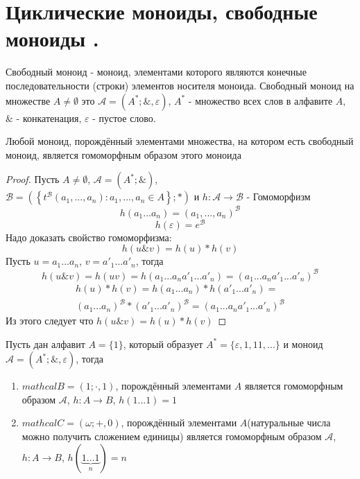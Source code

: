 \documentclass[../main/document.tex]{subfiles}
\begin{document}
\section{Циклические моноиды, свободные моноиды .}
\begin{dfn}
Свободный моноид - моноид, элементами которого являются конечные последовательности (строки) элементов носителя моноида. Свободный моноид на множестве $A\neq \emptyset$ это $\mathcal{A}=(A^*;\&,\varepsilon)$, $A^*$ - множество всех слов в алфавите $A$, $\&$ - конкатенация, $\varepsilon$ - пустое слово.
\end{dfn}
\begin{thm}
Любой моноид, порождённый элементами множества, на котором есть свободный моноид, является гомоморфным образом этого моноида
\begin{proof}
Пусть $A\neq \emptyset$, $\mathcal{A}=(A^*;\&)$,\\ $\mathcal{B}=(\left\{t^{\mathcal{B}}(a_1,...,a_n): a_1,...,a_n\in A\right\};*)$ и $h:\mathcal{A}\rightarrow \mathcal{B}$ - Гомоморфизм
$$h(a_1...a_n)=(a_1,...,a_n)^{\mathcal{B}}$$
$$h(\varepsilon)=e^{\mathcal{B}}$$
Надо доказать свойство гомоморфизма:
$$h(u\&v)=h(u)*h(v)$$
Пусть $u=a_1...a_n$, $v={a'}_1...{a'}_n$, тогда
$$h(u\&v)=h(uv)=h(a_1...a_n{a'}_1...{a'}_n)=(a_1...a_n{a'}_1...{a'}_n)^{\mathcal{B}}$$
\begin{multline*}
h(u)*h(v)=h(a_1...a_n)*h({a'}_1...{a'}_n)=\\
(a_1...a_n)^{\mathcal{B}}*({a'}_1...{a'}_n)^{\mathcal{B}}=(a_1...a_n{a'}_1...{a'}_n)^{\mathcal{B}}
\end{multline*}
Из этого следует что $h(u\&v)=h(u)*h(v)$
\end{proof}
\end{thm}
\begin{exm}

Пусть дан алфавит $A=\{1\}$, который образует $A^*=\{\varepsilon,1,11,...\}$ и моноид $\mathcal{A}=(A^*;\&,\varepsilon)$, тогда
\begin{enumerate}
\item $mathcal{B}=({1};\cdot,1)$, порождённый элементами $A$ является гомоморфным образом $\mathcal{A}$, $h:A\rightarrow B$, $h(1...1)=1$
\item $mathcal{C}=(\omega;+,0)$, порождённый элементами $A$(натуральные числа можно получить сложением единицы) является гомоморфным образом $\mathcal{A}$, $h:A\rightarrow B$, $h(\underbrace{1...1}_n)=n$
\end{enumerate}
\end{exm}
\end{document}
